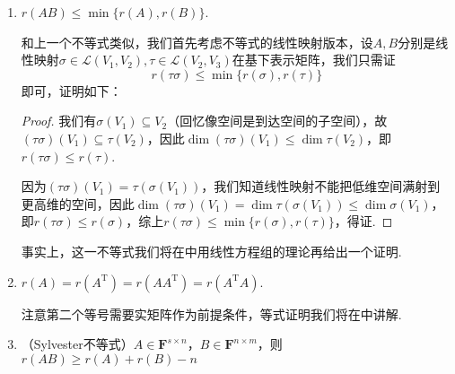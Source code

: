 \begin{enumerate}
\begin{proof}
              下面我们证明$r(A+B)\leqslant r(A)+r(B)$，这里我们站在线性映射的角度证明（接下来第3、5个不等式也是如此，将矩阵的证明转化为线性映射的证明）. 设$A,B$分别是线性映射$\sigma,\tau\in\mathcal{L}(V_1,V_2)$在基下表示矩阵. 事实上，矩阵的秩的定义就来源于线性映射的秩，即$r(A)=r(\sigma)$，$r(B)=r(\tau)$，因此我们只需要证明
              \[r(\sigma+\tau)\leqslant r(\sigma)+r(\tau),\]
              又根据线性映射的秩的定义，只需证明
              \[\dim(\sigma+\tau)(V_1)\leqslant \dim\sigma(V_1)+\dim\tau(V_1),\]
              事实上，$\forall\beta\in(\sigma+\tau)(V_1)$，$\exists\alpha\in V_1$，使得$\beta=(\sigma+\tau)\alpha=\sigma(\alpha)+\tau(\alpha)\in\sigma(V_1)+\tau(V_1)$，因此$(\sigma+\tau)(V_1)\subseteq\sigma(V_1)+\tau(V_1)$，故$\dim(\sigma+\tau)(V_1)\leqslant \dim(\sigma(V_1)+\tau(V_1))\leqslant \dim\sigma(V_1)+\dim\tau(V_1)$，得证（最后一个不等号来源于）.
          \end{proof}

    \item $r(AB) \leqslant \min\{r(A), r(B)\}$.

          和上一个不等式类似，我们首先考虑不等式的线性映射版本，设$A,B$分别是线性映射$\sigma\in\mathcal{L}(V_1,V_2),\tau\in\mathcal{L}(V_2,V_3)$在基下表示矩阵，我们只需证
          \[r(\tau\sigma)\leqslant \min\{r(\sigma), r(\tau)\}\]
          即可，证明如下：

          \begin{proof}
              我们有$\sigma(V_1)\subseteq V_2$（回忆像空间是到达空间的子空间），故$(\tau\sigma)(V_1)\subseteq\tau(V_2)$，因此$\dim(\tau\sigma)(V_1)\leqslant\dim\tau(V_2)$，即$r(\tau\sigma)\leqslant r(\tau)$.

              因为$(\tau\sigma)(V_1)=\tau(\sigma(V_1))$，我们知道线性映射不能把低维空间满射到更高维的空间，因此$\dim(\tau\sigma)(V_1)=\dim\tau(\sigma(V_1))\leqslant\dim\sigma(V_1)$，即$r(\tau\sigma)\leqslant r(\sigma)$，综上$r(\tau\sigma)\leqslant \min\{r(\sigma), r(\tau)\}$，得证.
          \end{proof}

          事实上，这一不等式我们将在中用线性方程组的理论再给出一个证明.

    \item $r(A)=r(A^\mathrm{T})=r(AA^\mathrm{T})=r(A^\mathrm{T}A)$.

          注意第二个等号需要实矩阵作为前提条件，等式证明我们将在中讲解.

    \item （Sylvester不等式）$A \in \mathbf{F}^{s \times n}$，$B \in \mathbf{F}^{n \times m}$，则$r(AB) \geqslant r(A)+r(B)-n$


\end{enumerate}
